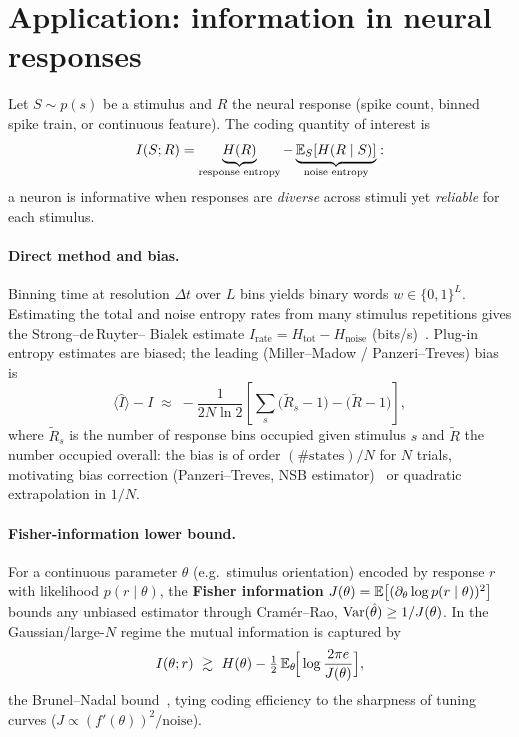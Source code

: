 \documentclass[11pt]{article}
\begin{document}
\section{Application: information in neural responses}
Let $S\sim p(s)$ be a stimulus and $R$ the neural response (spike count, binned spike train, or
continuous feature). The coding quantity of interest is
\begin{equation}
  I(S;R)=\underbrace{H(R)}_{\text{response entropy}}-\underbrace{\mathbb{E}_S[H(R\mid S)]}_{\text{noise entropy}} :
  \label{eq:neural}
\end{equation}
a neuron is informative when responses are \emph{diverse} across stimuli yet \emph{reliable} for
each stimulus.

\paragraph{Direct method and bias.}
Binning time at resolution $\Delta t$ over $L$ bins yields binary words $w\in\{0,1\}^L$. Estimating
the total and noise entropy rates from many stimulus repetitions gives the Strong--de\,Ruyter--%
Bialek estimate $I_{\mathrm{rate}}=H_{\mathrm{tot}}-H_{\mathrm{noise}}$ (bits/s)~\cite{strong1998,borst1999}. Plug-in entropy
estimates are biased; the leading (Miller--Madow / Panzeri--Treves) bias is
\begin{equation}
  \langle \hat I\rangle - I \;\approx\; -\frac{1}{2N\ln2}\left[\sum_{s}\big(\tilde R_s-1\big)-\big(\tilde R-1\big)\right],
\end{equation}
where $\tilde R_s$ is the number of response bins occupied given stimulus $s$ and $\tilde R$ the
number occupied overall: the bias is of order $(\#\text{states})/N$ for $N$ trials, motivating bias
correction (Panzeri--Treves, NSB estimator)~\cite{panzeri2007} or quadratic extrapolation in $1/N$.

\paragraph{Fisher-information lower bound.}
For a continuous parameter $\theta$ (e.g.\ stimulus orientation) encoded by response $r$ with
likelihood $p(r\mid\theta)$, the \textbf{Fisher information}
$J(\theta)=\mathbb{E}\big[(\partial_\theta\log p(r\mid\theta))^2\big]$ bounds any unbiased estimator
through Cram\'er--Rao, $\operatorname{Var}(\hat\theta)\ge1/J(\theta)$. In the Gaussian/large-$N$ regime the mutual
information is captured by
\begin{equation}
  I(\theta;r)\ \gtrsim\ H(\theta)-\tfrac12\,\E_\theta\!\Big[\log\frac{2\pi e}{J(\theta)}\Big],
\end{equation}
the Brunel--Nadal bound~\cite{brunelnadal1998}, tying coding efficiency to the sharpness of tuning
curves ($J\propto (f'(\theta))^2/\text{noise}$).
\end{document}
